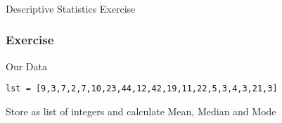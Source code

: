 \begin{frame}[fragile]\frametitle{}
\begin{center}
{\Large Descriptive Statistics Exercise}
\end{center}
\end{frame}

\begin{frame}[fragile]\frametitle{Exercise}	
Our Data
\begin{lstlisting}
lst = [9,3,7,2,7,10,23,44,12,42,19,11,22,5,3,4,3,21,3]
\end{lstlisting}

Store as list of integers and calculate Mean, Median and Mode
\end{frame}






